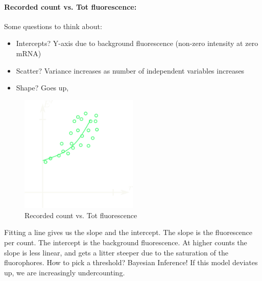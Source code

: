 \documentclass[../main.tex]{subfiles}
\begin{document}
\paragraph*{Recorded count vs. Tot fluorescence:} Some questions to think about:
\begin{itemize}
    \item Intercepts? Y-axis due to background fluorescence (non-zero intensity at zero mRNA)
    \item Scatter? Variance increases as number of independent variables increases
    \item Shape? Goes up,
\end{itemize}
\begin{figure}[ht]
    \centering
    \includegraphics[width=0.5\textwidth]{countvsfluor.png}
    \caption{Recorded count vs. Tot fluorescence}
    \label{fig:mRNA}
\end{figure}
Fitting a line gives us the slope and the intercept. The slope is the fluorescence per count. The
intercept is the background fluorescence. At higher counts the slope is less linear, and gets a
litter steeper due to the saturation of the fluorophores. How to pick a threshold? Bayesian
Inference! If this model deviates up, we are increasingly undercounting. 
\end{document}
